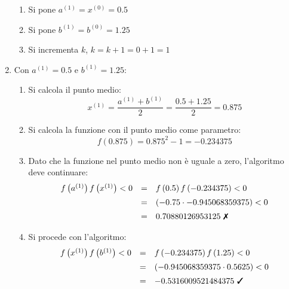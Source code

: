 \begin{examplebox}
\begin{enumerate}
\begin{enumerate}
            \item Si pone $a^{(1)} = x^{(0)} = 0.5$

            \item Si pone $b^{(1)} = b^{(0)} = 1.25$

            \item Si incrementa $k$, $k = k + 1 = 0 + 1 = 1$
        \end{enumerate}

        \item Con $a^{(1)} = 0.5$ e $b^{(1)} = 1.25$:
        \begin{enumerate}
            \item Si calcola il punto medio:
            \begin{equation*}
                x^{(1)} = \dfrac{a^{(1)} + b^{(1)}}{2} = \dfrac{0.5 + 1.25}{2} = 0.875
            \end{equation*}

            \item Si calcola la funzione con il punto medio come parametro:
            \begin{equation*}
                f\left(0.875\right) = 0.875^{2} - 1 = -0.234375
            \end{equation*}

            \item Dato che la funzione nel punto medio non è uguale a zero, l'algoritmo deve continuare:
            \begin{equation*}
                \begin{array}{rcl}
                    f\left(a^{(1)}\right)f\left(x^{(1)}\right) < 0 &=& f\left(0.5\right)f\left(-0.234375\right) < 0 \\ [.5em]
                    &=& \left(-0.75 \cdot -0.945068359375\right) < 0 \\ [.5em]
                    &=& 0.70880126953125 \text{ \ding{55}}
                \end{array}
            \end{equation*}
            
            \item Si procede con l'algoritmo:
            \begin{equation*}
                \begin{array}{rcl}
                    f\left(x^{(1)}\right)f\left(b^{(1)}\right) < 0 &=& f\left(-0.234375\right)f\left(1.25\right) < 0 \\ [.5em]
                    &=& \left(-0.945068359375 \cdot 0.5625\right) < 0 \\ [.5em]
                    &=& -0.5316009521484375 \text{ \ding{51}}
                \end{array}
            \end{equation*}


\end{enumerate}
\end{enumerate}
\end{examplebox}
